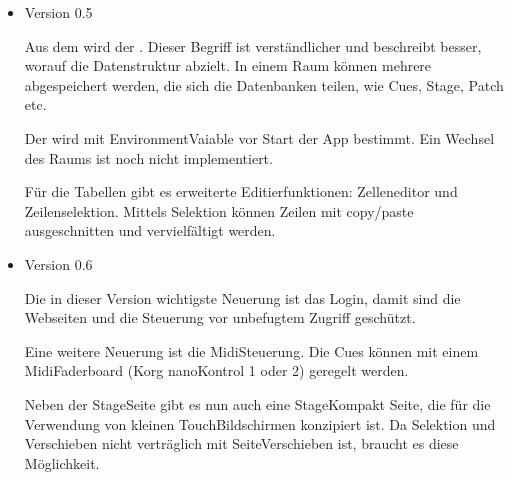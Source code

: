 \documentclass[letterpaper,10pt,ngerman]{sphinxmanual}
\begin{document}
\begin{itemize}
Sehr wichtige Neuerungen:
\begin{itemize}
\item {} 
Die Stage

Damit ist eine erste Geräte Einzelsteuerung geschaffen. Auf der
Stage\sphinxhyphen{}Fläche können Symbole, die für Geräte (Heads) oder Text stehen,
platziert werden.

\item {} 
Neue Programmstruktur: Die Webseiten werden in Module aufgeteilt.

Für die Benutzer zwar nicht relevant, aber mit dieser Struktur werden
viele Überschneidungen und Nebeneffekte vermieden.

\item {} 
Neues Datenkonzept: Alle Daten werden in einem 
zusammengefasst. Diese Zusammenfassung ermöglicht das Wechseln in
verschiedene Einheiten von Datenbanken.

\end{itemize}

\item {} 
Version 0.5

Aus dem  wird der . Dieser Begriff ist verständlicher
und beschreibt besser, worauf die Datenstruktur abzielt. In einem Raum
können mehrere  abgespeichert werden, die sich die
Datenbanken teilen, wie Cues, Stage, Patch etc.

Der  wird mit Environment\sphinxhyphen{}Vaiable vor Start der App bestimmt.
Ein Wechsel des Raums ist noch nicht implementiert.

Für die Tabellen gibt es erweiterte Editierfunktionen: Zelleneditor und
Zeilenselektion. Mittels Selektion können Zeilen mit copy/paste
ausgeschnitten und vervielfältigt werden.

\item {} 
Version 0.6

Die in dieser Version wichtigste Neuerung ist das Login, damit sind die
Webseiten und die Steuerung vor unbefugtem Zugriff geschützt.

Eine weitere Neuerung ist die Midi\sphinxhyphen{}Steuerung. Die Cues können mit einem
Midi\sphinxhyphen{}Faderboard (Korg nanoKontrol 1 oder 2) geregelt werden.

Neben der Stage\sphinxhyphen{}Seite gibt es nun auch eine Stage\sphinxhyphen{}Kompakt Seite, die
für die Verwendung von kleinen Touch\sphinxhyphen{}Bildschirmen konzipiert ist. Da
Selektion und Verschieben nicht verträglich mit Seite\sphinxhyphen{}Verschieben ist,
braucht es diese Möglichkeit.


\end{itemize}
\end{document}
